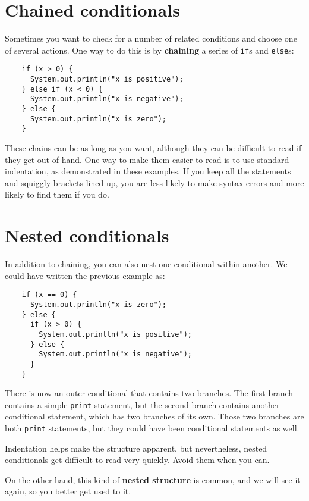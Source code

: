\documentclass[12pt]{book}
\theoremstyle{definition}
\begin{document}
\section {Chained conditionals}

Sometimes you want to check for a number of related conditions
and choose one of several actions.  One way to do this is by
{\bf chaining} a series of {\tt if}s and {\tt else}s:

\begin{lstlisting}
    if (x > 0) {
      System.out.println("x is positive");
    } else if (x < 0) {
      System.out.println("x is negative");
    } else {
      System.out.println("x is zero");
    }
\end{lstlisting}
%
These chains can be as long as you want, although they can
be difficult to read if they get out of hand.  One way to
make them easier to read is to use standard indentation,
as demonstrated in these examples.  If you keep all the
statements and squiggly-brackets lined up, you are less
likely to make syntax errors and more likely to find them
if you do.


\section{Nested conditionals}

In addition to chaining, you can also nest one conditional
within another.  We could have written the previous example
as:

\begin{lstlisting}
    if (x == 0) {
      System.out.println("x is zero");
    } else {
      if (x > 0) {
        System.out.println("x is positive");
      } else {
        System.out.println("x is negative");
      }
    }
\end{lstlisting}
%
There is now an outer conditional that contains two branches.  The
first branch contains a simple {\tt print} statement, but the second
branch contains another conditional statement, which has two branches
of its own.  Those two branches are both {\tt print}
statements, but they could have been conditional statements as
well.

Indentation helps make the structure
apparent, but nevertheless, nested conditionals get difficult to read
very quickly.  Avoid them when you can.

On the other hand, this kind of {\bf nested structure} is common, and
we will see it again, so you better get used to it.
\end{document}
